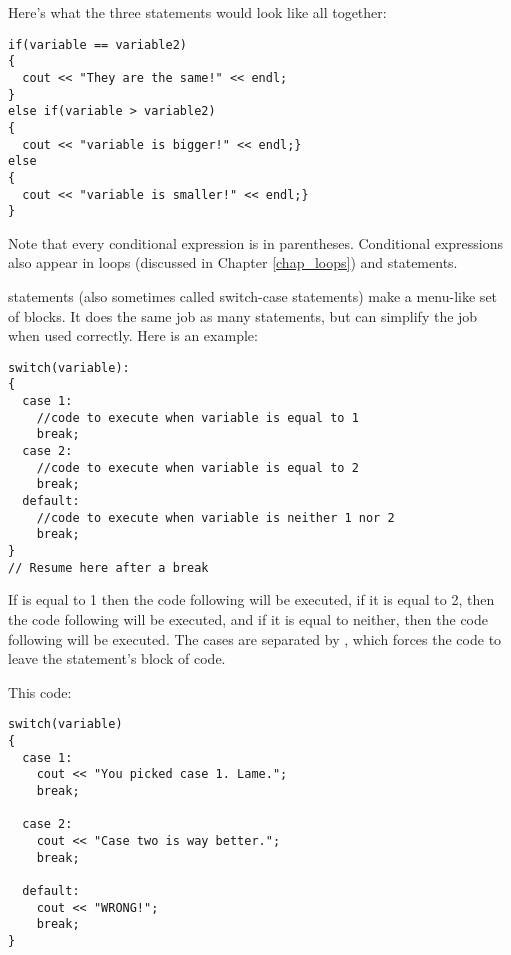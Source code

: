 
Here's what the three statements would look like all together:

\noindent\begin{minipage}{\linewidth}\begin{lstlisting}
if(variable == variable2)
{
  cout << "They are the same!" << endl;
}
else if(variable > variable2)
{
  cout << "variable is bigger!" << endl;}
else
{
  cout << "variable is smaller!" << endl;}
}
\end{lstlisting}\end{minipage}

Note that every conditional expression is in parentheses. 
Conditional expressions also appear in loops (discussed in Chapter \ref{chap_loops}) and  statements.


 statements (also sometimes called switch-case statements) make a menu-like set of blocks. 
It does the same job as many  statements, but can simplify the job when used correctly. 
Here is an example:

\noindent\begin{minipage}{\linewidth}\begin{lstlisting}
switch(variable):
{
  case 1:
    //code to execute when variable is equal to 1
    break;
  case 2:
    //code to execute when variable is equal to 2
    break;
  default:
    //code to execute when variable is neither 1 nor 2
    break;
}
// Resume here after a break
\end{lstlisting}\end{minipage}

If  is equal to 1 then the code following  will be executed, if it is equal to 2, then the code following  will be executed, and if it is equal to neither, then the code following  will be executed. 
The cases are separated by , which forces the code to leave the  statement's block of code.

This code:

\noindent\begin{minipage}{\linewidth}\begin{lstlisting}
switch(variable)
{
  case 1:
    cout << "You picked case 1. Lame.";
    break;

  case 2:
    cout << "Case two is way better.";
    break;

  default:
    cout << "WRONG!";
    break;
}
\end{lstlisting}\end{minipage}

